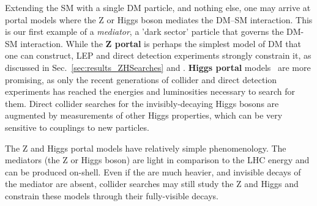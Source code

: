 
Extending the SM with a single DM particle, and nothing else, one may arrive at portal models where the Z or Higgs boson mediates the DM--SM interaction.%
This is our first example of a {\it mediator}, a 'dark sector' particle that governs the DM-SM interaction.
While the \textbf{Z portal} is perhaps the simplest model of DM that one can construct, LEP and direct detection experiments strongly constrain it, as discussed in Sec.~\ref{sec:results_ZHSearches} and . 
\textbf{Higgs portal} models~\cite{Patt:2006fw,Djouadi:2011aa} are more promising, as only the recent generations of collider and direct detection experiments has reached the energies and luminosities necessary to search for them.%
Direct collider searches for the invisibly-decaying Higgs bosons are augmented by measurements of other Higgs properties, which can be very sensitive to couplings to new particles.

The Z and Higgs portal models have relatively simple phenomenology.
The mediators (the Z or Higgs boson) are light in comparison to the LHC energy and can be produced on-shell.
Even if the \IP are much heavier, and invisible decays of the mediator are absent, collider searches may still study the Z and Higgs and constrain these models through their fully-visible decays.





